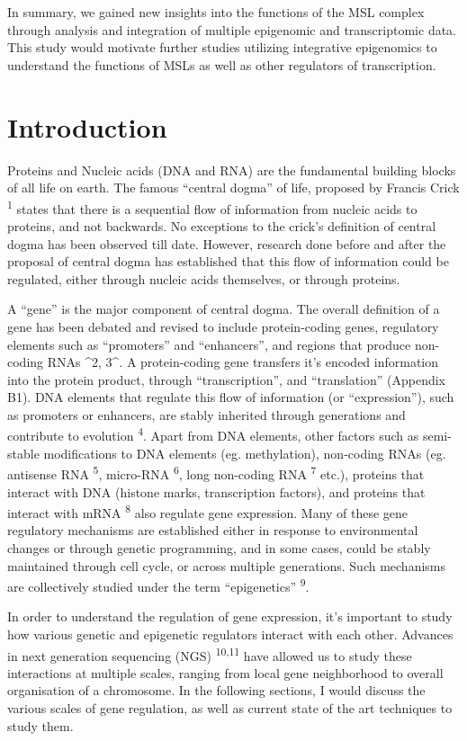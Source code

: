 \documentclass[11pt,twoside]{MPIthesis}
\theoremstyle{definition}
\theoremstyle{definition}
\theoremstyle{definition}
\theoremstyle{remark}
\begin{document}
In summary, we gained new insights into the functions of the MSL complex
through analysis and integration of multiple epigenomic and
transcriptomic data. This study would motivate further studies utilizing
integrative epigenomics to understand the functions of MSLs as well as
other regulators of transcription. 

\chapter{Introduction}\label{introduction}

Proteins and Nucleic acids (DNA and RNA) are the fundamental building
blocks of all life on earth. The famous ``central dogma'' of life,
proposed by Francis Crick \textsuperscript{1} states that there is a
sequential flow of information from nucleic acids to proteins, and not
backwards. No exceptions to the crick's definition of central dogma has
been observed till date. However, research done before and after the
proposal of central dogma has established that this flow of information
could be regulated, either through nucleic acids themselves, or through
proteins.

A ``gene'' is the major component of central dogma. The overall
definition of a gene has been debated and revised to include
protein-coding genes, regulatory elements such as ``promoters'' and
``enhancers'', and regions that produce non-coding RNAs \^{}2, 3\^{}. A
protein-coding gene transfers it's encoded information into the protein
product, through ``transcription'', and ``translation'' (Appendix B1).
DNA elements that regulate this flow of information (or ``expression''),
such as promoters or enhancers, are stably inherited through generations
and contribute to evolution \textsuperscript{4}. Apart from DNA
elements, other factors such as semi-stable modifications to DNA
elements (eg. methylation), non-coding RNAs (eg. antisense RNA
\textsuperscript{5}, micro-RNA \textsuperscript{6}, long non-coding RNA
\textsuperscript{7} etc.), proteins that interact with DNA (histone
marks, transcription factors), and proteins that interact with mRNA
\textsuperscript{8} also regulate gene expression. Many of these gene
regulatory mechanisms are established either in response to
environmental changes or through genetic programming, and in some cases,
could be stably maintained through cell cycle, or across multiple
generations. Such mechanisms are collectively studied under the term
``epigenetics'' \textsuperscript{9}.

In order to understand the regulation of gene expression, it's important
to study how various genetic and epigenetic regulators interact with
each other. Advances in next generation sequencing (NGS)
\textsuperscript{10,11} have allowed us to study these interactions at
multiple scales, ranging from local gene neighborhood to overall
organisation of a chromosome. In the following sections, I would discuss
the various scales of gene regulation, as well as current state of the
art techniques to study them.
\end{document}
